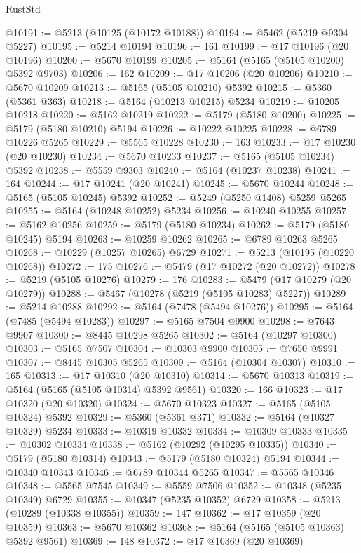 \begin{lexlean}{RustStd}
\begin{coremodule}
@10191 := @5213 (@10125 (@10172 @10188))
@10194 := @5462 (@5219 @9304 @5227)
@10195 := @5214 @10194
@10196 := 161
@10199 := @17 @10196 (@20 @10196)
@10200 := @5670 @10199
@10205 := @5164 (@5165 (@5105 @10200) @5392 @9703)
@10206 := 162
@10209 := @17 @10206 (@20 @10206)
@10210 := @5670 @10209
@10213 := @5165 (@5105 @10210) @5392
@10215 := @5360 (@5361 @363)
@10218 := @5164 (@10213 @10215) @5234
@10219 := @10205 @10218
@10220 := @5162 @10219
@10222 := @5179 (@5180 @10200)
@10225 := @5179 (@5180 @10210) @5194
@10226 := @10222 @10225
@10228 := @6789 @10226 @5265
@10229 := @5565 @10228
@10230 := 163
@10233 := @17 @10230 (@20 @10230)
@10234 := @5670 @10233
@10237 := @5165 (@5105 @10234) @5392
@10238 := @5559 @9303
@10240 := @5164 (@10237 @10238)
@10241 := 164
@10244 := @17 @10241 (@20 @10241)
@10245 := @5670 @10244
@10248 := @5165 (@5105 @10245) @5392
@10252 := @5249 (@5250 @1408) @5259 @5265
@10255 := @5164 (@10248 @10252) @5234
@10256 := @10240 @10255
@10257 := @5162 @10256
@10259 := @5179 (@5180 @10234)
@10262 := @5179 (@5180 @10245) @5194
@10263 := @10259 @10262
@10265 := @6789 @10263 @5265
@10268 := @10229 (@10257 @10265) @6729
@10271 := @5213 (@10195 (@10220 @10268))
@10272 := 175
@10276 := @5479 (@17 @10272 (@20 @10272))
@10278 := @5219 (@5105 @10276)
@10279 := 176
@10283 := @5479 (@17 @10279 (@20 @10279))
@10288 := @5467 (@10278 (@5219 (@5105 @10283) @5227))
@10289 := @5214 @10288
@10292 := @5164 (@7478 (@5494 @10276))
@10295 := @5164 (@7485 (@5494 @10283))
@10297 := @5165 @7504 @9900
@10298 := @7643 @9907
@10300 := @8445 @10298 @5265
@10302 := @5164 (@10297 @10300)
@10303 := @5165 @7507
@10304 := @10303 @9900
@10305 := @7650 @9991
@10307 := @8445 @10305 @5265
@10309 := @5164 (@10304 @10307)
@10310 := 165
@10313 := @17 @10310 (@20 @10310)
@10314 := @5670 @10313
@10319 := @5164 (@5165 (@5105 @10314) @5392 @9561)
@10320 := 166
@10323 := @17 @10320 (@20 @10320)
@10324 := @5670 @10323
@10327 := @5165 (@5105 @10324) @5392
@10329 := @5360 (@5361 @371)
@10332 := @5164 (@10327 @10329) @5234
@10333 := @10319 @10332
@10334 := @10309 @10333
@10335 := @10302 @10334
@10338 := @5162 (@10292 (@10295 @10335))
@10340 := @5179 (@5180 @10314)
@10343 := @5179 (@5180 @10324) @5194
@10344 := @10340 @10343
@10346 := @6789 @10344 @5265
@10347 := @5565 @10346
@10348 := @5565 @7545
@10349 := @5559 @7506
@10352 := @10348 (@5235 @10349) @6729
@10355 := @10347 (@5235 @10352) @6729
@10358 := @5213 (@10289 (@10338 @10355))
@10359 := 147
@10362 := @17 @10359 (@20 @10359)
@10363 := @5670 @10362
@10368 := @5164 (@5165 (@5105 @10363) @5392 @9561)
@10369 := 148
@10372 := @17 @10369 (@20 @10369)

\end{coremodule}
\end{lexlean}
